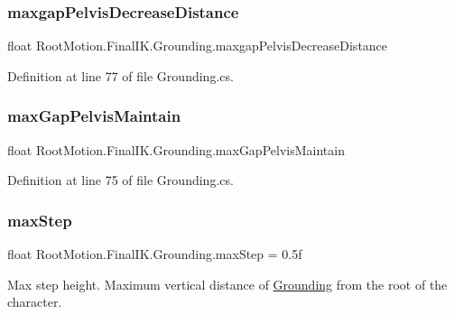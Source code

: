 \subsubsection{\texorpdfstring{maxgap\+Pelvis\+Decrease\+Distance}{maxgapPelvisDecreaseDistance}}
{\footnotesize\ttfamily float Root\+Motion.\+Final\+I\+K.\+Grounding.\+maxgap\+Pelvis\+Decrease\+Distance}



Definition at line 77 of file Grounding.\+cs.

\mbox{\label{class_root_motion_1_1_final_i_k_1_1_grounding_aeff923fa4e969044d47263ce6209cb0d}} 
\subsubsection{\texorpdfstring{max\+Gap\+Pelvis\+Maintain}{maxGapPelvisMaintain}}
{\footnotesize\ttfamily float Root\+Motion.\+Final\+I\+K.\+Grounding.\+max\+Gap\+Pelvis\+Maintain}



Definition at line 75 of file Grounding.\+cs.

\mbox{\label{class_root_motion_1_1_final_i_k_1_1_grounding_afd0474d3135209cf53d00c019933e2a2}} 
\subsubsection{\texorpdfstring{max\+Step}{maxStep}}
{\footnotesize\ttfamily float Root\+Motion.\+Final\+I\+K.\+Grounding.\+max\+Step = 0.\+5f}



Max step height. Maximum vertical distance of \mbox{\hyperlink{class_root_motion_1_1_final_i_k_1_1_grounding}{Grounding}} from the root of the character. 



